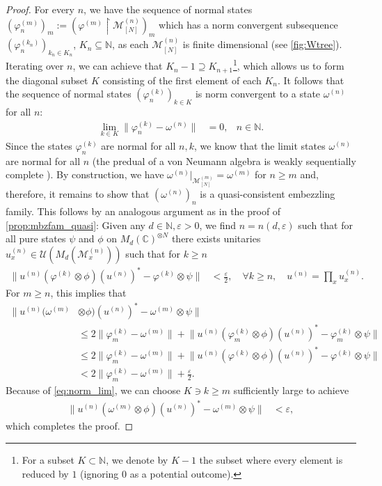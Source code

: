 \documentclass[a4paper, 10pt, onecolumn, accepted=2025-07-22]{quantumarticle}
\theoremstyle{definition}
\newcommand{\norm}[1]{\lVert #1\rVert}
\newcommand{\ox}{\otimes}
\newcommand{\mc}{\mathcal}
\newcommand{\eps}{\varepsilon}
\newcommand{\up}[1]{^{(#1)}}
\def\CC{{\mathbb C}}
\def\M{{\mc M}}
\def\U{{\mc U}}
\def\NN{{\mathbb N}}
\newcommand*{\1}{\text{\usefont{U}{bbold}{m}{n}1}}
\begin{document}
\begin{proof}
    For every $n$, we have the sequence of normal states $(\varphi\up{m}_n)_m := (\varphi\up{m}\restriction \M\up{n}_{[N]})_{m}$ which has a norm convergent subsequence $(\varphi\up{k_{n}}_n)_{k_{n}\in K_{n}}$, $K_{n}\subseteq\NN$, as each $\M\up{n}_{[N]}$ is finite dimensional (see \cref{fig:Wtree}). 
    Iterating over $n$, we can achieve that $K_{n}-1\supseteq K_{n+1}$\footnote{For a subset $K\subset \NN$, we denote by $K-1$ the subset where every element is reduced by $1$ (ignoring $0$ as a potential outcome).}, which allows us to form the diagonal subset $K$ consisting of the first element of each $K_{n}$. 
    It follows that the sequence of normal states $(\varphi\up{k}_n)_{k\in K}$ is norm convergent to a state $\omega\up{n}$ for all $n$:
    \begin{align}
        \lim_{k\in K} \norm{\varphi\up{k}_n-\omega\up{n}} & = 0, &  n\in\NN.
    \end{align}
    Since the states $\varphi\up{k}_n$ are normal for all $n,k$, we know that the limit states $\omega\up{n}$ are normal for all $n$ (the predual of a von Neumann algebra is weakly sequentially complete \cite[Cor.~III.5.2]{takesaki1}). 
    By construction, we have $\omega\up{n}|_{\M\up{m}_{[N]}} = \omega\up{m}$ for $n\geq m$ and, therefore, it remains to show that $(\omega\up{n})_{n}$ is a quasi-consistent embezzling family. 
    This follows by an analogous argument as in the proof of \cref{prop:mbzfam_quasi}: Given any $d\in\NN, \eps>0$, we find $n = n(d,\eps)$ such that for all pure states $\psi$ and $\phi$ on $M_{d}(\CC)^{\ox N}$ there exists unitaries $u\up{n}_x\in\U(M_{d}(\M\up{n}_x))$ such that for $k\geq n$
    \begin{align*}
    \norm{u\up{n}(\varphi\up{k}\ox\phi)(u\up{n})^{*}-\varphi\up{k}\ox\psi} & < \tfrac{\eps}{2},\quad \forall k\geq n,\quad u\up{n}=\prod_x u\up{n}_x.
    \end{align*}
    For $m\geq n$, this implies that
    \begin{align*}
    \| u\up{n}(\omega\up{m} &\ox\phi)(u\up{n})^{*}-\omega\up{m}\ox\psi \| \\ 
    &\leq 2 \norm{\varphi\up{k}_m\!-\!\omega\up{m}} + \norm{u\up{n}(\varphi\up{k}_m\ox\phi)(u\up{n})^{*}-\varphi\up{k}_m\ox\psi} 
    \\
    & \leq 2 \norm{\varphi\up{k}_m\!-\!\omega\up{m}} + \norm{u\up{n}(\varphi\up{k}\ox\phi)(u\up{n})^{*}-\varphi\up{k}\ox\psi} \\
    & < 2\norm{\varphi\up{k}_m\!-\!\omega\up{m}} + \tfrac{\eps}{2}.
    \end{align*}
    Because of \cref{eq:norm_lim}, we can choose $K\ni k\geq m$ sufficiently large to achieve
    \begin{align*}
    \norm{u\up{n}(\omega\up{m}\ox\phi)(u\up{n})^{*}-\omega\up{m}\ox\psi} & < \eps,
    \end{align*}
    which completes the proof.
\end{proof}
\end{document}
